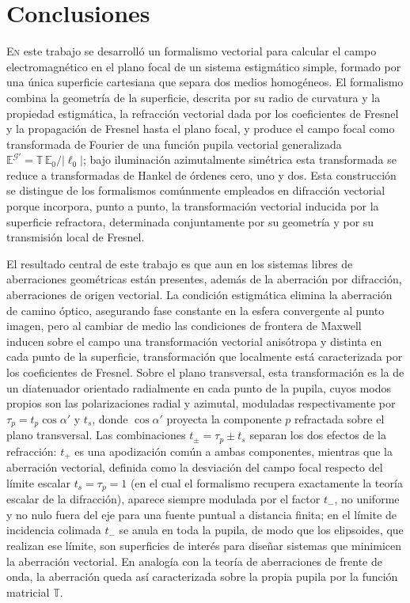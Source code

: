\chapter*{Conclusiones}

\lettrine[lines=2]{E}{n} este trabajo se desarrolló un formalismo vectorial para
calcular el campo electromagnético en el plano focal de un sistema estigmático
simple, formado por una única superficie cartesiana que separa dos medios
homogéneos. El formalismo combina la geometría de la superficie, descrita
por su radio de curvatura y la propiedad estigmática, la refracción
vectorial dada por los coeficientes de Fresnel y la propagación de
Fresnel hasta el plano focal, y produce el campo focal como transformada de
Fourier de una función pupila vectorial generalizada
$\mathbb E^{\mathscr G'}=\mathbb T\,\mathbb E_0/|\ell_0|$; bajo iluminación
azimutalmente simétrica esta transformada se reduce a transformadas de Hankel
de órdenes cero, uno y dos. Esta construcción se distingue de los formalismos
comúnmente empleados en difracción vectorial porque incorpora, punto a punto,
la transformación vectorial inducida por la superficie refractora, determinada
conjuntamente por su geometría y por su transmisión local de Fresnel.

El resultado central de este trabajo es que aun en los sistemas libres de
aberraciones geométricas están presentes, además de la aberración por
difracción, aberraciones de origen vectorial. La condición estigmática
elimina la aberración de camino óptico, asegurando fase constante en la
esfera convergente al punto imagen, pero al cambiar de medio las condiciones
de frontera de Maxwell~\cite{jackson1999} inducen sobre el campo una transformación vectorial
anisótropa y distinta en cada punto de la superficie, transformación que
localmente está caracterizada por los coeficientes de Fresnel. Sobre el plano transversal, esta transformación
es la de un diatenuador orientado radialmente en cada punto de la pupila,
cuyos modos propios son las polarizaciones radial y azimutal, moduladas
respectivamente por $\tau_p=t_p\cos\alpha'$ y $t_s$, donde $\cos\alpha'$
proyecta la componente $p$ refractada sobre el plano transversal. Las
combinaciones $t_\pm=\tau_p\pm t_s$
separan los dos efectos de la refracción: $t_+$ es una apodización común a
ambas componentes, mientras que la aberración vectorial, definida como la
desviación del campo focal respecto del límite escalar $t_s=\tau_p=1$ (en el
cual el formalismo recupera exactamente la teoría escalar de la difracción),
aparece siempre modulada por el factor $t_-$, no uniforme y no nulo fuera
del eje para una fuente puntual a distancia finita; en el límite de incidencia
colimada $t_-$ se anula en toda la pupila, de modo que los elipsoides, que
realizan ese límite, son superficies de interés para diseñar sistemas que
minimicen la aberración vectorial. En analogía con la teoría
de aberraciones de frente de onda, la aberración queda así caracterizada
sobre la propia pupila por la función matricial $\mathbb T$.

